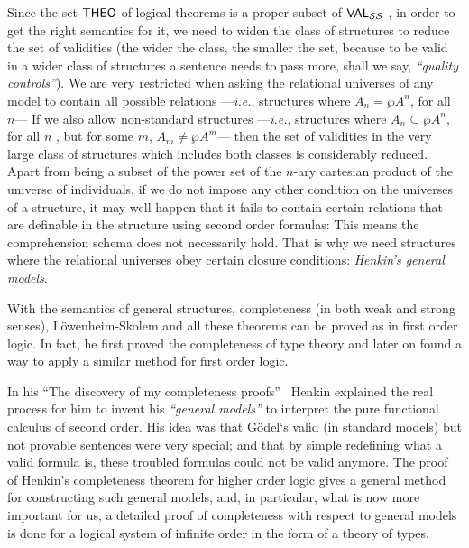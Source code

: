 Since the set $\textsf{THEO}$ of logical theorems is a proper subset of 
$\textsf{VAL}_{\mathcal{SS}}$ , in order to get the right semantics for it, we
need to widen the class of structures to reduce the set of validities (the
wider the class, the smaller the set, because to be valid in a wider class
of structures a sentence needs to pass more, shall we say, 
\emph{``quality controls''}). We are very
restricted when asking the relational universes of any model to contain all
possible relations ---\emph{i.e.}, structures where $A_{n}=\mathcal{\wp }%
A^{n}$, for all $n$--- If we also allow non-standard structures ---\emph{i.e.}, structures where $A_{n}\subseteq \mathcal{\wp }A^{n}$, for all $n$ , but
for some $m$, $A_{m}\neq \mathcal{\wp }A^{m}$--- then the set of validities
in the very large class of structures which includes both classes is
considerably reduced. Apart from being a subset of the power set of the 
$n$-ary cartesian product of the universe of individuals, if we do not impose
any other condition on the universes of a structure, it may well happen that
it fails to contain certain relations that are definable in the structure
using second order formulas: This means the comprehension schema does not
necessarily hold. That is why we need structures where the relational
universes obey certain closure conditions: \emph{Henkin's general models}.

With the semantics of general structures, completeness (in both weak and
strong senses), L\"{o}wenheim-Skolem and all these theorems can be proved as
in first order logic. In fact, he first proved the completeness of type
theory and later on found a way to apply a similar method for first order
logic.

In his ``The discovery of my completeness
proofs''~\cite{Henkin1996} Henkin explained the real
process for him to invent his \emph{``general
models''} to interpret the pure functional calculus of
second order. His idea was that G\"{o}del`s valid (in standard models) but
not provable sentences were very special; and that by simple redefining what
a valid formula is, these troubled formulas could not be valid anymore. The
proof of Henkin's completeness theorem for higher order logic gives a
general method for constructing such general models, and, in particular,
what is now more important for us, a detailed proof of completeness with
respect to general models is done for a logical system of infinite order in
the form of a theory of types.
